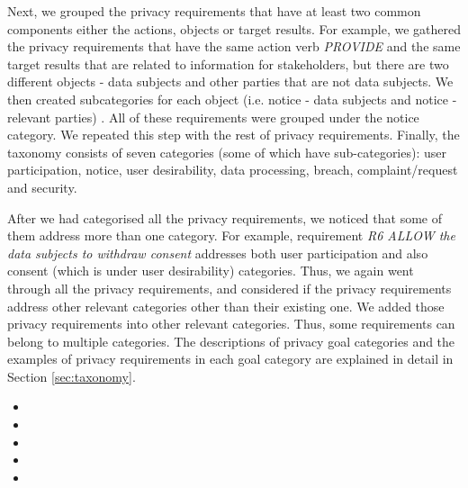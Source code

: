 Next, we grouped the privacy requirements that have at least two common components either the actions, objects or target results. For example, we gathered the privacy requirements that have the same action verb \emph{PROVIDE} and the same target results that are related to information for stakeholders, but there are two different objects - data subjects and other parties that are not data subjects. We then created subcategories for each object (i.e. notice - data subjects and notice - relevant parties) . All of these requirements were grouped under the notice category. We repeated this step with the rest of privacy requirements. Finally, the taxonomy consists of seven categories (some of which have sub-categories): user participation, notice, user desirability, data processing, breach, complaint/request and security. 

After we had categorised all the privacy requirements, we noticed that some of them address more than one category. For example, requirement \emph{R6 ALLOW the data subjects to withdraw consent} addresses both user participation and also consent (which is under user desirability) categories. Thus, we again went through all the privacy requirements, and considered if the privacy requirements address other relevant categories other than their existing one. We added those privacy requirements into other relevant categories. Thus, some requirements can belong to multiple categories. The descriptions of privacy goal categories and the examples of privacy requirements in each goal category are explained in detail in Section \ref{sec:taxonomy}. \\


\begin{itemize}[leftmargin=*,noitemsep]
	\item {}
	\item {}
	\item {}
	\item {}
	\item {}
\end{itemize}

